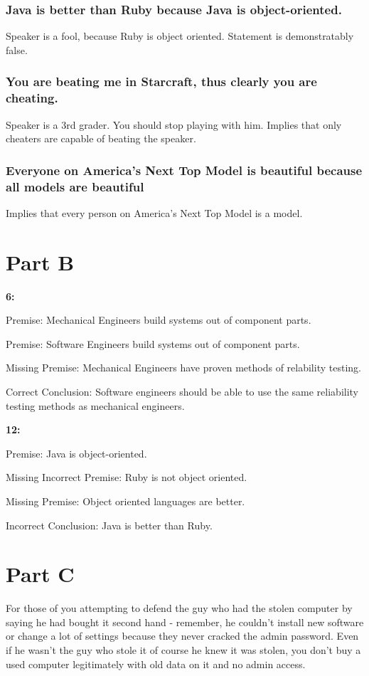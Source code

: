 \documentclass[11pt]{article}
\begin{document}
\section{Java is better than Ruby because Java is object-oriented.}
Speaker is a fool, because Ruby is object oriented.  Statement is demonstratably false.

\section{You are beating me in Starcraft, thus clearly you are cheating.}
Speaker is a 3rd grader.  You should stop playing with him.  Implies that only
cheaters are capable of beating the speaker.

\section{Everyone on America's Next Top Model is beautiful because all models are beautiful}
Implies that every person on America's Next Top Model is a model. 

\part*{Part B}

\textbf{6:}

Premise: Mechanical Engineers build systems out of component parts.

Premise: Software Engineers build systems out of component parts.

Missing Premise: Mechanical Engineers have proven methods of relability testing.

Correct Conclusion: Software engineers should be able to use the same reliability testing methods as mechanical engineers.

\textbf{12:}

Premise: Java is object-oriented.

Missing Incorrect Premise: Ruby is not object oriented.

Missing Premise: Object oriented languages are better.

Incorrect Conclusion: Java is better than Ruby.

\part*{Part C}

For those of you attempting to defend the guy who had the stolen computer by saying he had bought it second hand - remember, he couldn't install new software or change a lot of settings because they never cracked the admin password. Even if he wasn't the guy who stole it of course he knew it was stolen, you don't buy a used computer legitimately with old data on it and no admin access.
\end{document}
